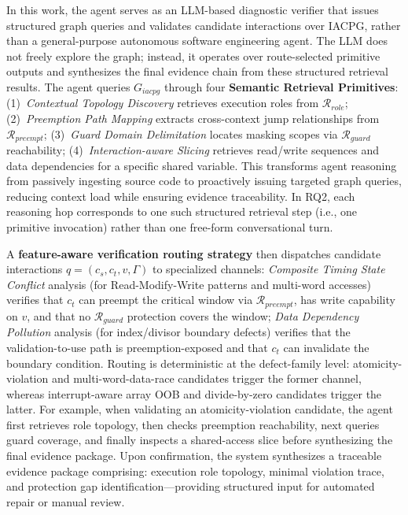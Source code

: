\documentclass[conference]{IEEEtran}
\begin{document}
In this work, the agent serves as an LLM-based diagnostic verifier that issues structured graph queries and validates candidate interactions over IACPG, rather than a general-purpose autonomous software engineering agent. The LLM does not freely explore the graph; instead, it operates over route-selected primitive outputs and synthesizes the final evidence chain from these structured retrieval results.
The agent queries $G_{iacpg}$ through four \textbf{Semantic Retrieval Primitives}: (1)~\textit{Contextual Topology Discovery} retrieves execution roles from $\mathcal{R}_{role}$; (2)~\textit{Preemption Path Mapping} extracts cross-context jump relationships from $\mathcal{R}_{preempt}$; (3)~\textit{Guard Domain Delimitation} locates masking scopes via $\mathcal{R}_{guard}$ reachability; (4)~\textit{Interaction-aware Slicing} retrieves read/write sequences and data dependencies for a specific shared variable. This transforms agent reasoning from passively ingesting source code to proactively issuing targeted graph queries, reducing context load while ensuring evidence traceability. In RQ2, each reasoning hop corresponds to one such structured retrieval step (i.e., one primitive invocation) rather than one free-form conversational turn.

A \textbf{feature-aware verification routing strategy} then dispatches candidate interactions $q=(c_s,c_t,v,\Gamma)$ to specialized channels: \textit{Composite Timing State Conflict} analysis (for Read-Modify-Write patterns and multi-word accesses) verifies that $c_t$ can preempt the critical window via $\mathcal{R}_{preempt}$, has write capability on $v$, and that no $\mathcal{R}_{guard}$ protection covers the window; \textit{Data Dependency Pollution} analysis (for index/divisor boundary defects) verifies that the validation-to-use path is preemption-exposed and that $c_t$ can invalidate the boundary condition. Routing is deterministic at the defect-family level: atomicity-violation and multi-word-data-race candidates trigger the former channel, whereas interrupt-aware array OOB and divide-by-zero candidates trigger the latter. For example, when validating an atomicity-violation candidate, the agent first retrieves role topology, then checks preemption reachability, next queries guard coverage, and finally inspects a shared-access slice before synthesizing the final evidence package. Upon confirmation, the system synthesizes a traceable evidence package comprising: execution role topology, minimal violation trace, and protection gap identification---providing structured input for automated repair or manual review.
\end{document}
